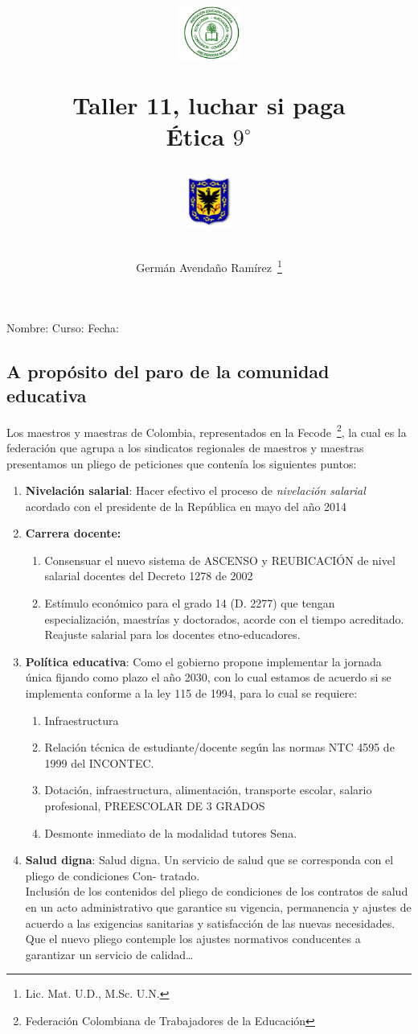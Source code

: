\documentclass[letterpaper,11pt,twoside]{article}
\author{Germ\'an Avenda\~no Ram\'irez~\thanks{Lic. Mat. U.D., M.Sc. U.N.}}
\title{\begin{minipage}{.2\textwidth}
\includegraphics[height=1.75cm]{Images/logo-colegio.png}\end{minipage}
\begin{minipage}{.55\textwidth}
\begin{center}
Taller 11, luchar si paga\\
Ética $9^{\circ}$
\end{center}
\end{minipage}\hfill
\begin{minipage}{.2\textwidth}
\includegraphics[height=1.75cm]{Images/logo-sed.png} 
\end{minipage}}
\date{}
\begin{document}
\maketitle
Nombre: \hrulefill Curso: \underline{\hspace*{44pt}} Fecha: \underline{\hspace*{2.5cm}}
\begin{multicols}{2}
 \section*{A propósito del paro de la comunidad educativa}
 Los maestros y maestras de Colombia, representados en la Fecode~\footnote{Federación Colombiana de Trabajadores de la Educación}, la cual es la federación que agrupa a los sindicatos regionales de maestros y maestras presentamos un pliego de peticiones que contenía los siguientes puntos:
 \begin{enumerate}
 \item \textbf{Nivelación salarial}: Hacer efectivo el proceso de \emph{nivelación salarial} acordado con el presidente de la República en mayo del año 2014
 \item \textbf{Carrera docente:} 
 \begin{enumerate}
 \item  Consensuar el nuevo sistema de ASCENSO y REUBICACIÓN de nivel salarial docentes del Decreto 1278 de 2002
 \item Estímulo económico para el grado 14 (D. 2277) que tengan especialización, maestrías y doctorados, acorde con el tiempo acreditado. Reajuste salarial para los docentes etno-educadores.
\end{enumerate}  
 \item \textbf{Política educativa}: Como el gobierno propone implementar la jornada única fijando como plazo el año 2030, con lo cual estamos de acuerdo si se implementa conforme a la ley 115 de 1994, para lo cual se requiere:
 \begin{enumerate}
 \item Infraestructura
 \item Relación técnica de estudiante/docente según las normas NTC 4595 de 1999 del INCONTEC.
\item Dotación, infraestructura, alimentación, transporte escolar, salario profesional, PREESCOLAR DE 3 GRADOS
\item Desmonte inmediato de la modalidad tutores Sena.
 \end{enumerate}
 \item \textbf{Salud digna}: Salud digna. Un servicio de salud que se corresponda con el pliego de condiciones Con-
tratado.\\
Inclusión de los contenidos del pliego de condiciones de los
contratos de salud en un acto administrativo que garantice su
vigencia, permanencia y ajustes de acuerdo a las exigencias sanitarias y satisfacción de las nuevas necesidades. Que el nuevo pliego contemple los ajustes normativos conducentes a garantizar un servicio de calidad\ldots
 \end{enumerate}
\end{multicols}
\end{document}
